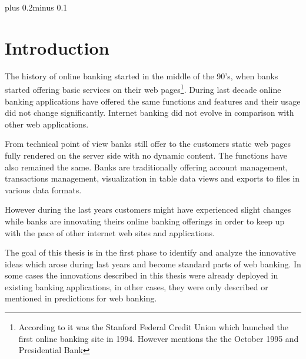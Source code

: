 \documentclass[11pt,twoside,a4paper]{book}
\begin{document}
\tableofcontents
\listoffigures
\listoftables


\mainbodystarts
\normalfont
{}\baselineskip plus 0.2\baselineskip minus 0.1\baselineskip



\chapter{Introduction}
The history of online banking started in the middle of the 90's, when banks started offering basic services on their web pages\footnote{According to \cite{wiki:onlinebanking} it was the Stanford Federal Credit Union which launched the first online banking site in 1994. However \cite{banking_history}  mentions the the October 1995 and Presidential Bank}.  During last decade online banking applications have offered the same functions and features and their usage did not change significantly. Internet banking did not evolve in comparison with other web applications.

From technical point of view banks still offer to the customers static web pages fully rendered on the server side with no dynamic content. The functions have also remained the same. Banks are traditionally offering account management, transactions management, visualization in table data views and exports to files in various data formats.

However during the last years customers might have experienced slight changes while banks are innovating theirs online banking offerings in order to keep up with the pace of other internet web sites and applications.

The goal of this thesis is in the first phase to identify and analyze the innovative ideas which arose during last years and become standard parts of web banking. In some cases the innovations described in this thesis were already deployed in existing banking applications, in other cases, they were only described or mentioned in predictions for web banking.
\end{document}
